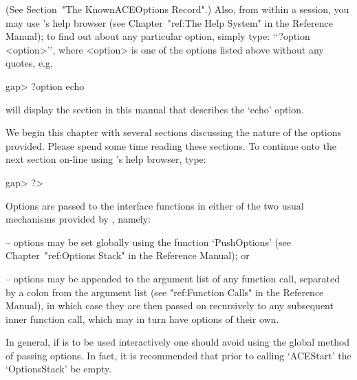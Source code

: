 (See Section~"The KnownACEOptions Record".) Also, from within a {\GAP}
session, you may use {\GAP}'s help browser (see Chapter~"ref:The  Help
System" in the  {\GAP}  Reference  Manual);  to  find  out  about  any
particular {\ACE} option, simply type: \lq{}`?option <option>'', where
<option> is one of the options listed above without any quotes, e.g.

\beginexample
gap> ?option echo
\endexample

will display the section in this  manual  that  describes  the  `echo'
option.

We begin this chapter with several sections discussing the  nature  of
the options provided. Please spend some time reading  these  sections.
To continue onto the next section on-line using {\GAP}'s help browser,
type:

\beginexample
gap> ?>
\endexample


Options are passed to the {\ACE} interface functions in either of the
two usual mechanisms provided by {\GAP}, namely:

\beginlist

\item{--} options may be set globally using the function `PushOptions'
(see Chapter~"ref:Options Stack" in the {\GAP} Reference  Manual); or

\item{--} options may be appended to the argument list of any function
call, separated by a colon from the argument list  (see  "ref:Function
Calls" in the {\GAP} Reference Manual), in which case  they  are  then
passed on recursively to any subsequent inner function call, which may
in turn have options of their own.

\endlist

In general, if {\ACE} is to be used  interactively  one  should  avoid
using the global method of passing options. In fact, it is recommended
that prior to calling `ACEStart' the `OptionsStack' be empty.


\beginitems

